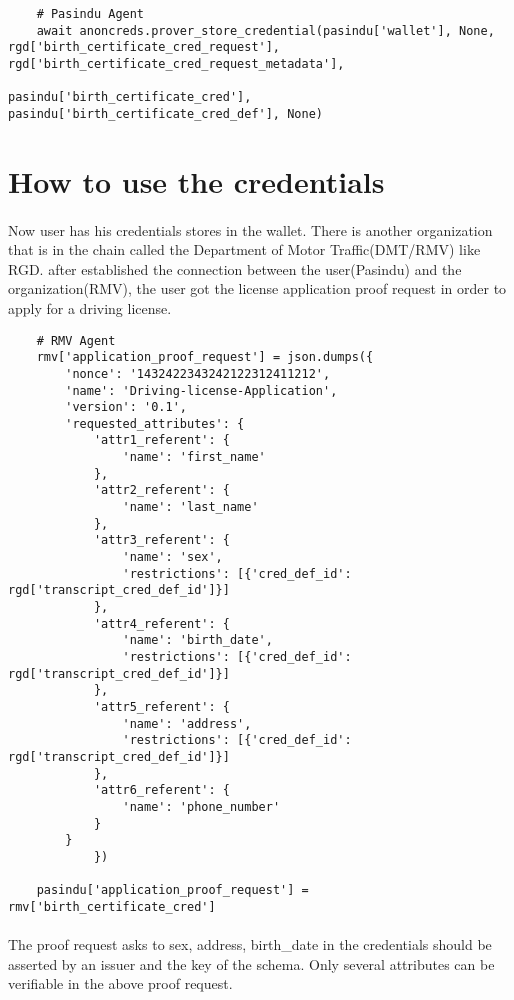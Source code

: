 \begin{verbatim}
    # Pasindu Agent
    await anoncreds.prover_store_credential(pasindu['wallet'], None, rgd['birth_certificate_cred_request'], rgd['birth_certificate_cred_request_metadata'],
                                            pasindu['birth_certificate_cred'], pasindu['birth_certificate_cred_def'], None)

\end{verbatim}

\section{How to use the credentials}

\paragraph{}
Now user has his credentials stores in the wallet. There is another organization that is in the chain called the Department of Motor Traffic(DMT/RMV) like RGD. after established the connection between the user(Pasindu) and the organization(RMV), the user got the license application proof request in order to apply for a driving license.

\begin{verbatim}
    # RMV Agent
    rmv['application_proof_request'] = json.dumps({
        'nonce': '1432422343242122312411212',
        'name': 'Driving-license-Application',
        'version': '0.1',
        'requested_attributes': {
            'attr1_referent': {
                'name': 'first_name'
            },
            'attr2_referent': {
                'name': 'last_name'
            },
            'attr3_referent': {
                'name': 'sex',
                'restrictions': [{'cred_def_id': rgd['transcript_cred_def_id']}]
            },
            'attr4_referent': {
                'name': 'birth_date',
                'restrictions': [{'cred_def_id': rgd['transcript_cred_def_id']}]
            },
            'attr5_referent': {
                'name': 'address',
                'restrictions': [{'cred_def_id': rgd['transcript_cred_def_id']}]
            },
            'attr6_referent': {
                'name': 'phone_number'
            }
        }
            })
    
    pasindu['application_proof_request'] = rmv['birth_certificate_cred']
\end{verbatim}

\paragraph{}
The proof request asks to sex, address, birth\_date in the credentials should be asserted by an issuer and the key of the schema. Only several attributes can be verifiable in the above proof request.

